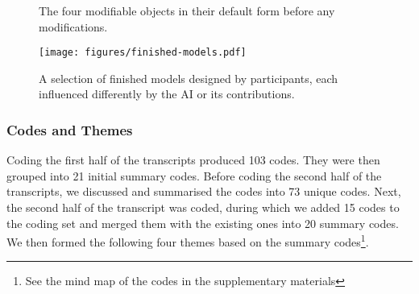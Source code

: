 \begin{figure*}
	\centering
		\vspace{.07cm}
		\vspace{.07cm}
		\vspace{.07cm}
		\vspace{.3cm}
	\caption{The four modifiable objects in their default form before any modifications.}%
	\label{fig:modmodels}%
\end{figure*}

\begin{figure*}
	\centering
	\texttt{[image: figures/finished-models.pdf]}		
	\caption{A selection of finished models designed by participants, each influenced differently by the AI or its contributions.}
	\label{fig:inflmodels}
\end{figure*}

\subsubsection{Codes and Themes}
Coding the first half of the transcripts produced 103 codes.
They were then grouped into 21 initial summary codes.
Before coding the second half of the transcripts, we discussed and summarised the codes into 73 unique codes.
Next, the second half of the transcript was coded, during which we added 15 codes to the coding set and merged them with the existing ones into 20 summary codes. We then formed the following four themes based on the summary codes\footnote{See the mind map of the codes in the supplementary materials}.

